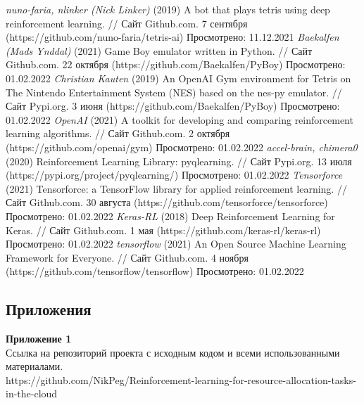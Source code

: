 \documentclass{article}
\newcommand\zz[1]{\par{\normalsize\strut #1} \hfill\ignorespaces}
\begin{document}
\begin{center}
\begin{thebibliography}{}
 \textit{nuno-faria, nlinker (Nick Linker)} (2019) A bot that plays tetris using deep reinforcement learning. // Сайт Github.com. 7 сентября (https://github.com/nuno-faria/tetris-ai) Просмотрено: 11.12.2021
 \textit{Baekalfen (Mads Ynddal)} (2021) Game Boy emulator written in Python. // Сайт Github.com. 22 октября (https://github.com/Baekalfen/PyBoy) Просмотрено: 01.02.2022
 \textit{Christian Kauten} (2019) An OpenAI Gym environment for Tetris on The Nintendo Entertainment System (NES) based on the nes-py emulator. // Сайт Pypi.org. 3 июня (https://github.com/Baekalfen/PyBoy) Просмотрено: 01.02.2022
 \textit{OpenAI} (2021) A toolkit for developing and comparing reinforcement learning algorithms. // Сайт Github.com. 2 октября (https://github.com/openai/gym) Просмотрено: 01.02.2022
 \textit{accel-brain, chimera0} (2020) Reinforcement Learning Library: pyqlearning. // Сайт Pypi.org. 13 июля (https://pypi.org/project/pyqlearning/) Просмотрено: 01.02.2022
 \textit{Tensorforce} (2021) Tensorforce: a TensorFlow library for applied reinforcement learning. // Сайт Github.com. 30 августа (https://github.com/tensorforce/tensorforce) Просмотрено: 01.02.2022
 \textit{Keras-RL} (2018) Deep Reinforcement Learning for Keras. // Сайт Github.com. 1 мая (https://github.com/keras-rl/keras-rl) Просмотрено: 01.02.2022
 \textit{tensorflow} (2021) An Open Source Machine Learning Framework for Everyone. // Сайт Github.com. 4 ноября (https://github.com/tensorflow/tensorflow) Просмотрено: 01.02.2022
\end{thebibliography}
\end{center}
\newpage
\begin{center}
\section {Приложения}
\end{center}
\zz{}\textbf{Приложение 1\\}
Ссылка на репозиторий проекта с исходным кодом и всеми использованными материалами.\\
https://github.com/NikPeg/Reinforcement-learning-for-resource-allocation-tasks-in-the-cloud
\end{document}
